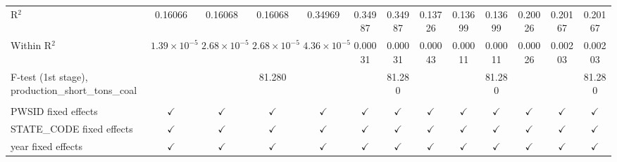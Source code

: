 \begin{table}[htbp]
\begin{adjustbox}{width = \textwidth, center}
\begin{tabular}{lcccccccccccc}
         R$^2$                                                & 0.16066               & 0.16068               & 0.16068                & 0.34969               & 0.34987       & 0.34987               & 0.13726                & 0.13699       & 0.13699                & 0.20026               & 0.20167         & 0.20167\\  
         Within R$^2$                                         & $1.39\times 10^{-5}$  & $2.68\times 10^{-5}$  & $2.68\times 10^{-5}$   & $4.36\times 10^{-5}$  & 0.00031       & 0.00031               & 0.00043                & 0.00011       & 0.00011                & 0.00026               & 0.00203         & 0.00203\\  
         F-test (1st stage), production\_short\_tons\_coal    &                       &                       & 81.280                 &                       &               & 81.280                &                        &               & 81.280                 &                       &                 & 81.280\\  
          \\
         PWSID fixed effects                                  & $\checkmark$          & $\checkmark$          & $\checkmark$           & $\checkmark$          & $\checkmark$  & $\checkmark$          & $\checkmark$           & $\checkmark$  & $\checkmark$           & $\checkmark$          & $\checkmark$    & $\checkmark$\\   
         STATE\_CODE fixed effects                            & $\checkmark$          & $\checkmark$          & $\checkmark$           & $\checkmark$          & $\checkmark$  & $\checkmark$          & $\checkmark$           & $\checkmark$  & $\checkmark$           & $\checkmark$          & $\checkmark$    & $\checkmark$\\   
         year fixed effects                                   & $\checkmark$          & $\checkmark$          & $\checkmark$           & $\checkmark$          & $\checkmark$  & $\checkmark$          & $\checkmark$           & $\checkmark$  & $\checkmark$           & $\checkmark$          & $\checkmark$    & $\checkmark$\\   
         \bottomrule
      \end{tabular}
   \end{adjustbox}
\end{table}


